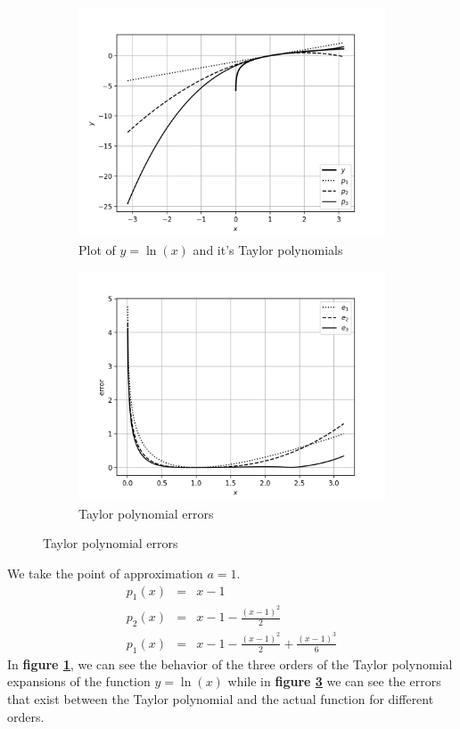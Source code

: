 \documentclass[12,a4paper]{article}
\begin{document}
    \begin{figure}[h!]
        \centering
        \begin{subfigure}[t]{0.49\textwidth}
            \includegraphics[width=\textwidth]{plots/q1p3.png}
            \caption{Plot of $y=\ln(x)$ and it's Taylor polynomials}
            \label{fig:q4a}
        \end{subfigure}
        \begin{subfigure}[t]{0.49\textwidth}
            \includegraphics[width=\textwidth]{plots/q1p4.png}
            \caption{Taylor polynomial errors}
            \label{fig:q4b}
        \end{subfigure}
    \end{figure}
    We take the point of approximation $a = 1$.
    \begin{eqnarray}
        p_1(x) &=& x - 1 \nonumber \\
        p_2(x) &=& x - 1 - \frac{(x-1)^2}{2} \nonumber \\
        p_1(x) &=& x - 1 - \frac{(x-1)^2}{2} + \frac{(x-1)^3}{6} \nonumber
    \end{eqnarray}
    In \textbf{figure \ref{fig:q4a}}, we can see the behavior of the three orders of the Taylor polynomial expansions of the function $y=\ln(x)$ while in \textbf{figure \ref{fig:q4b}} we can see the errors that exist between the Taylor polynomial and the actual function for different orders.
\end{document}
